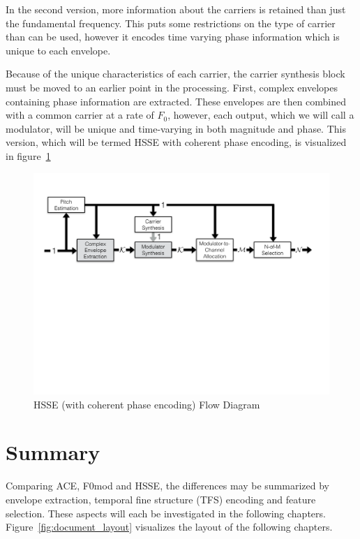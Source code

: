 \documentclass [11pt, proquest,oneside] {ganter_thesis}[2015/03/03]
\begin{document}
In the second version, more information about the carriers is retained than just the fundamental frequency.  This puts some restrictions on the type of carrier than can be used, however it encodes time varying phase information which is unique to each envelope.

Because of the unique characteristics of each carrier, the carrier synthesis block must be moved to an earlier point in the processing.  First, complex envelopes containing phase information are extracted.  These envelopes are then combined with a common carrier at a rate of $F_0$, however, each output, which we will call a modulator, will be unique and time-varying in both magnitude and phase.  This version, which will be termed HSSE with coherent phase encoding, is visualized in figure~\ref{fig:HSSE_flow_2}

\begin{figure}[!ht]
  \centering
    \includegraphics[width=1\textwidth]{HSSE_flow_diagram_Phase}   
    \caption{HSSE (with coherent phase encoding) Flow Diagram}\label{fig:HSSE_flow_2}
\end{figure}

\section{Summary}

Comparing ACE, F0mod and HSSE, the differences may be summarized by envelope extraction, temporal fine structure (TFS) encoding and feature selection.  These aspects will each be investigated in the following chapters.  Figure~\ref{fig:document_layout} visualizes the layout of the following chapters.
\end{document}
